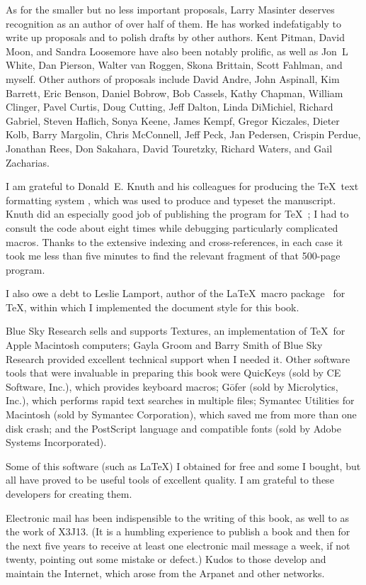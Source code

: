 As for the smaller but no less important proposals,
Larry Masinter deserves recognition as an author of over half of them.
He has worked indefatigably to write up proposals and to polish
drafts by other authors.  Kent Pitman, David Moon, and Sandra Loosemore
have also been notably prolific,
as well as Jon~L White, Dan Pierson, Walter van Roggen,
Skona Brittain, Scott Fahlman, and myself.
Other authors of proposals include
David Andre,
John Aspinall,
Kim Barrett,
Eric Benson,
Daniel Bobrow,
Bob Cassels,
Kathy Chapman,
William Clinger,
Pavel Curtis,
Doug Cutting,
Jeff Dalton,
Linda DiMichiel,
Richard Gabriel,
Steven Haflich,
Sonya Keene,
James Kempf,
Gregor Kiczales,
Dieter Kolb,
Barry Margolin,
Chris McConnell,
Jeff Peck,
Jan Pedersen,
Crispin Perdue,
Jonathan Rees,
Don Sakahara,
David Touretzky,
Richard Waters, and
Gail Zacharias.

I am grateful to Donald~E. Knuth and his colleagues for producing
the \TeX\ text formatting system \cite{KNUTH-TEXBOOK},
which was used to produce
and typeset the manuscript.
Knuth did an especially good job of publishing the program for
\TeX~\cite{KNUTH-TEX-PROGRAM};
I had to consult the code about eight times while debugging particularly
complicated macros.  Thanks to the extensive indexing
and cross-references, in each case it took me less than five minutes to
find the relevant fragment of that 500-page program.

I also owe a debt
to Leslie Lamport, author of the \LaTeX\ macro package~\cite{LAMPORT-LATEX}
for \TeX,
within which I implemented the document style for this book.

Blue Sky Research sells and supports Textures, an implementation
of \TeX\ for Apple Macintosh computers; Gayla Groom and Barry Smith
of Blue Sky Research provided excellent technical support when I
needed it.  Other software tools that were invaluable
in preparing this book were QuicKeys (sold by CE Software, Inc.),
which provides keyboard macros;
G\=ofer (sold by Microlytics, Inc.), which performs rapid
text searches in multiple files; Symantec Utilities for Macintosh
(sold by Symantec Corporation), which saved me from more than one disk crash;
and the PostScript language and compatible
fonts (sold by Adobe Systems Incorporated).

Some of this software (such as \LaTeX) I obtained for free and some I bought,
but all have proved to be useful tools of excellent quality.
I am grateful to these developers for creating them.

Electronic mail has been indispensible to
the writing of this book, as well to as the work of X3J13.
(It is a humbling experience to publish a book and then for
the next five years to receive
at least one electronic mail message a week, if not twenty, pointing out
some mistake or defect.)
Kudos to those develop and maintain the Internet, which arose
from the Arpanet and other networks.

